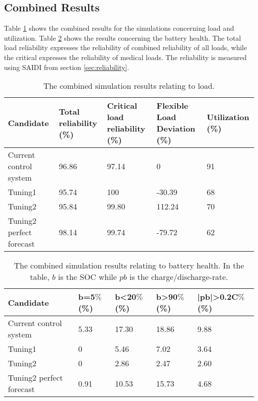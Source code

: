 \subsection{Combined Results}
Table \ref{tab:combined_results_load} shows the combined results for the simulations concerning load and utilization. Table \ref{tab:combined_results_battery} shows the results concerning the battery health. The total load reliability expresses the reliability of combined reliability of all loads, while the critical expresses the reliability of medical loads. The reliability is measured using SAIDI from section \ref{sec:reliability}. 


\begin{table}[h]
    \centering
    \fontsize{12pt}{12pt}\selectfont
    \begin{tabular}{p{3cm}||p{2cm}|p{2.5cm}|p{2.5cm}|p{1cm}}
       Candidate  & Total reliability (\%) & Critical load reliability (\%) & Flexible Load Deviation (\%) & Utilization (\%)\\
       \hline
       \hline
       Current control system       & 96.86 & 97.14 & 0 & 91\\
       \hline
       Tuning1                      & 95.74 & 100 & -30.39 & 68\\
       \hline
       Tuning2                      & 95.84 & 99.80 & 112.24 & 70\\
       \hline
       Tuning2 perfect forecast     & 98.14 & 99.74 & -79.72 & 62\\
       
    \end{tabular}
    \caption[Simulation results - Load]{The combined simulation results relating to load.}
    \label{tab:combined_results_load}
\end{table}

\begin{table}[h]
    \centering
    \begin{tabular}{p{3cm}||p{2cm}|p{2cm}|p{2cm}|p{2cm}}
       Candidate  & b=5$\%$ (\%) &b<20$\%$ (\%) & b>90$\%$ (\%) & |pb|>0.2C$\%$ (\%)\\
       \hline
       \hline
        Current control system  & 5.33 & 17.30 & 18.86 & 9.88\\
       \hline
       Tuning1                  & 0 & 5.46 & 7.02 & 3.64\\
       \hline
       Tuning2                  & 0 & 2.86 & 2.47 & 2.60\\
       \hline
       Tuning2 perfect forecast & 0.91 & 10.53 & 15.73 & 4.68\\
       
    \end{tabular}
    \caption[Simulation results - Battery]{The combined simulation results relating to battery health. In the table, $b$ is the SOC while $pb$ is the charge/discharge-rate.}
    \label{tab:combined_results_battery}
\end{table}

